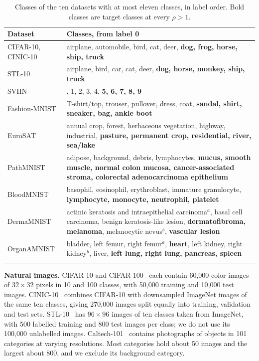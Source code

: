 \documentclass[review,number,sort&compress]{elsarticle}
\theoremstyle{definition}
\begin{document}
\begin{table}[t]
\caption{Classes of the ten datasets with at most eleven classes, in
label order. Bold classes are target classes at every $\rho>1$.}
\label{tab:dataset-classes}
\centering
\footnotesize
\setlength{\tabcolsep}{3pt}
\renewcommand{\arraystretch}{1.1}
\begin{tabular}{@{}>{\raggedright\arraybackslash}p{2.4cm}%
>{\raggedright\arraybackslash}p{}@{}}
\toprule
Dataset & Classes, from label 0 \\
\midrule
CIFAR-10, CINIC-10 & airplane, automobile, bird, cat, deer,
\textbf{dog, frog, horse, ship, truck} \\
STL-10 & airplane, bird, car, cat, deer,
\textbf{dog, horse, monkey, ship, truck} \\
SVHN & 0, 1, 2, 3, 4, \textbf{5, 6, 7, 8, 9} \\
Fashion-MNIST & T-shirt/top, trouser, pullover, dress, coat,
\textbf{sandal, shirt, sneaker, bag, ankle boot} \\
EuroSAT & annual crop, forest, herbaceous vegetation, highway,
industrial, \textbf{pasture, permanent crop, residential, river,
sea/lake} \\
PathMNIST & adipose, background, debris, lymphocytes, \textbf{mucus,
smooth muscle, normal colon mucosa, cancer-associated stroma,
colorectal adenocarcinoma epithelium} \\
BloodMNIST & basophil, eosinophil, erythroblast, immature granulocyte,
\textbf{lymphocyte, monocyte, neutrophil, platelet} \\
DermaMNIST & actinic keratosis and intraepithelial carcinoma$^{a}$,
basal cell carcinoma, benign keratosis-like lesion,
\textbf{dermatofibroma, melanoma}, melanocytic nevus$^{b}$,
\textbf{vascular lesion} \\
OrganAMNIST & bladder, left femur, right femur$^{a}$, \textbf{heart},
left kidney, right kidney$^{b}$, liver, \textbf{left lung, right lung,
pancreas, spleen} \\
\bottomrule
\multicolumn{2}{@{}l}{$^{a}$Target only at $\rho=10$.\quad
$^{b}$Target only at $\rho=50$ and $\rho=100$.} \\
\end{tabular}
\end{table}

\textbf{Natural images.} CIFAR-10 and
CIFAR-100~\citep{krizhevsky2009learning} each contain 60{,}000 color
images of $32\times32$ pixels in 10 and 100 classes, with 50{,}000
training and 10{,}000 test images. CINIC-10~\citep{darlow2018cinic} combines
CIFAR-10 with downsampled ImageNet images of the same ten classes,
giving 270{,}000 images split equally into training, validation and
test sets. STL-10~\citep{coates2011analysis} has $96\times96$ images of
ten classes taken from ImageNet, with 500 labelled training and 800
test images per class; we do not use its 100{,}000 unlabelled images.
Caltech-101~\citep{feifei2004learning} contains photographs of objects in
101 categories at varying resolutions. Most categories hold about 50
images and the largest about 800, and
we exclude its background category.
\end{document}

